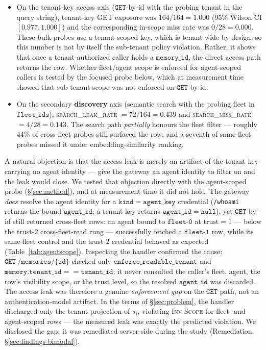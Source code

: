 \documentclass[10pt,twocolumn,letterpaper]{article}
\begin{document}
\begin{itemize}
\item On the tenant-key access axis (\(\mathtt{GET}\)-by-id with the probing tenant in the query string), tenant-key GET exposure was \(164/164 = 1.000\) (95\% Wilson CI \([0.977, 1.000]\)) and the corresponding in-scope miss rate was \(0/28 = 0.000\). These bulk probes use a tenant-scoped key, which is tenant-wide by design, so this number is not by itself the sub-tenant policy violation. Rather, it shows that once a tenant-authorized caller holds a \(\mathtt{memory\_id}\), the direct access path returns the row. Whether fleet/agent scope is enforced for agent-scoped callers is tested by the focused probe below, which at measurement time showed that sub-tenant scope was not enforced on \(\mathtt{GET}\)-by-id.
\item On the secondary \textbf{discovery} axis (semantic search with the probing fleet in \(\mathtt{fleet\_ids}\)), \textsc{search\_leak\_rate} \(= 72/164 = 0.439\) and \textsc{search\_miss\_rate} \(= 4/28 = 0.143\). The search path \emph{partially} honours the fleet filter --- roughly \(44\%\) of cross-fleet probes still surfaced the row, and a seventh of same-fleet probes missed it under embedding-similarity ranking.
\end{itemize}

A natural objection is that the access leak is merely an artifact of the tenant key carrying no agent identity --- give the gateway an agent identity to filter on and the leak would close. We tested that objection directly with the agent-scoped probe (\S\ref{sec:method}), and at measurement time it did not hold. The gateway \emph{does} resolve the agent identity for a \(\mathtt{kind{=}agent\_key}\) credential (\texttt{/whoami} returns the bound \(\mathtt{agent\_id}\); a tenant key returns \(\mathtt{agent\_id{=}null}\)), yet \(\mathtt{GET}\)-by-id still returned cross-fleet rows: an agent bound to \(\mathtt{fleet\text{-}0}\) at \(\text{trust}=1\) --- below the trust-\(2\) cross-fleet-read rung --- successfully fetched a \(\mathtt{fleet\text{-}1}\) row, while its same-fleet control and the trust-\(2\) credential behaved as expected (Table~\ref{tab:agentscope}). Inspecting the handler confirmed the cause: \(\mathtt{GET\ /memories/\{id\}}\) checked only \(\mathtt{enforce\_readable\_tenant}\) and \(\mathtt{memory.tenant\_id == tenant\_id}\); it never consulted the caller's fleet, agent, the row's visibility scope, or the trust level, so the resolved \(\mathtt{agent\_id}\) was discarded. The access leak was therefore a genuine \emph{enforcement gap} on the \(\mathtt{GET}\) path, not an authentication-model artifact. In the terms of \S\ref{sec:problem}, the handler discharged only the tenant projection of \(s_i\), violating \textsc{Inv-Scope} for fleet- and agent-scoped rows --- the measured leak was exactly the predicted violation. We disclosed the gap; it was remediated server-side during the study (Remediation, \S\ref{sec:findings-bimodal}).
\end{document}
